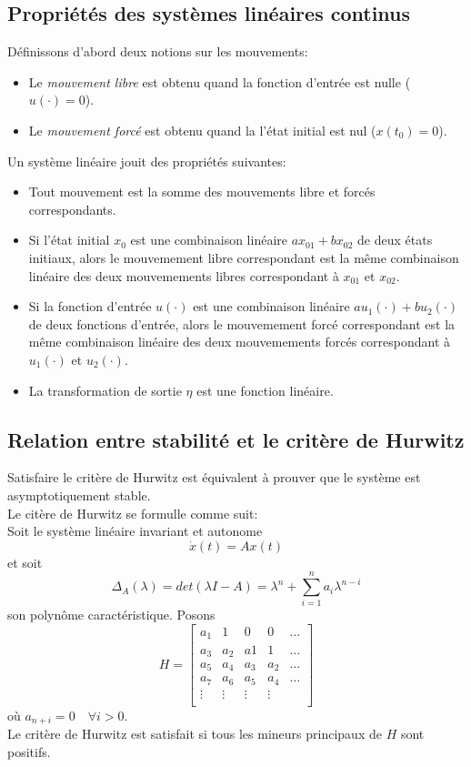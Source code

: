 \documentclass[a4paper]{article}
\begin{document}
\subsection{Propriétés des systèmes linéaires continus}
Définissons d'abord deux notions sur les mouvements:
\begin{itemize}
	\item Le \emph{mouvement libre} est obtenu quand la fonction d'entrée est
		nulle ($u(\cdot)=0$).
	\item Le \emph{mouvement forcé} est obtenu quand la l'état initial est nul
		($x(t_0)=0$).
\end{itemize}
Un système linéaire jouit des propriétés suivantes:
\begin{itemize}
	\item Tout mouvement est la somme des mouvements libre et forcés
		correspondants.
	\item Si l'état initial $x_0$ est une combinaison linéaire
		$ax_{01} + bx_{02}$ de deux états initiaux, alors le mouvemement libre
		correspondant est la même combinaison linéaire des deux mouvemements
		libres correspondant à $x_{01}$ et $x_{02}$.
	\item Si la fonction d'entrée $u(\cdot)$ est une combinaison linéaire
		$au_1(\cdot) + bu_2(\cdot)$ de deux fonctions d'entrée, alors le
		mouvemement forcé correspondant est la même combinaison linéaire des
		deux mouvemements forcés correspondant à $u_1(\cdot)$ et $u_2(\cdot)$.
	\item La transformation de sortie $\eta$ est une fonction linéaire.
\end{itemize}

\subsection{Relation entre stabilité et le critère de Hurwitz}
Satisfaire le critère de Hurwitz est équivalent à prouver que le système
est asymptotiquement stable.\\
Le citère de Hurwitz se formulle comme suit:\\
Soit le système linéaire invariant et autonome
\[\dot x(t)=Ax(t)\]
et soit
\[\Delta_A(\lambda)=det(\lambda I - A)
= \lambda^n+\sum_{i=1}^na_i\lambda^{n-i}\]
son polynôme caractéristique. Posons
\[H=\begin{bmatrix}
	a_1 & 1 & 0 & 0 & \dots \\
	a_3 & a_2 & a1 & 1 & \dots \\
	a_5 & a_4 & a_3 & a_2 & \dots \\
	a_7 & a_6 & a_5 & a_4 & \dots \\
	\vdots & \vdots & \vdots & \vdots & \\
\end{bmatrix}
\]
où $a_{n+i} = 0\quad\forall i > 0$.\\
Le critère de Hurwitz est satisfait si tous les mineurs principaux de $H$ sont
positifs.
\end{document}
